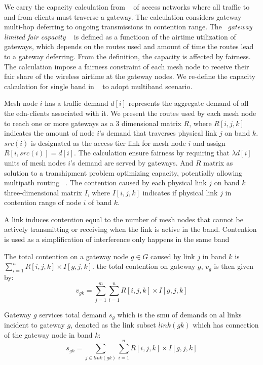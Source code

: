 We carry the capacity calculation from ~\cite{robinson2008adding} of access networks where all traffic to and from clients must traverse a gateway. 
The calculation considers gateway multi-hop deferring to ongoing transmissions in contention range. 
The ~\emph{gateway limited fair capacity} ~\cite{robinson2008adding} is defined as a functioon of the airtime utilization of gateways, which depends on the routes used and amount of time the routes lead to a gateway deferring. From the definition, the capacity is affected by fairness. The calculation impose a fairness constraint of each mesh node to receive their fair share of the wireless airtime at the gateway nodes. 
We re-define the capacity calculation for single band in ~\cite{robinson2008adding} to adopt multiband scenario.

Mesh node $i$ has a traffic demand $d[i]$ represents the aggregate demand of all the edn-clients associated with it. 
We present the routes used by each mesh node to reach one or more gateways as a 3 dimensional matrix $R$, where $R[i,j,k]$ indicates the amount of node $i$'s demand that traverses physical link $j$ on band $k$. 
$src(i)$ is designated as the access tier link for mesh node $i$ and assign $R[i,src(i)]=d[i]$. The calculation ensure fairness by requiring that $\lambda d[i]$ units of mesh nodes $ i$'s demand are served by gateways.
And $R$ matrix as solution to a transhipment problem optimizing capacity, potentially allowing multipath routing ~\cite{robinson2008adding}.
The contention caused by each physical link $j$ on band $k$ three-dimensional matrix $I$, where $I[i,j,k]$ indicates if physical link $j$  in contention range of node $i$ of band $k$.

A link induces contention equal to the number of mesh nodes that cannot be actively transmitting or receiving when the link is active in the band.
Contention is used as a simplification of interference only happens in the same band 

The total contention on a gateway node $g\in G$ caused by link $j$ in band $k$ is $\sum_{i=1}^nR[i,j,k] \times I[g,j,k]$. the total contention on gateway $g$, $v_g$ is then given by:
\begin{equation}
v_{gk}=\sum_{j=1}^m \sum_{i=1}^n R[i,j,k]\times I[g,j,k]
\end{equation}

Gateway $g$ services total demand $s_g$ which is the smu of demands on al links incident to gateway $g$, denoted as the link subset $link(gk)$ which has connection of the gateway node in band $k$:
\begin{equation}
s_{gk}=\sum_{j\in link(gk)} \sum_{i=1}^n R[i,j,k]\times I[g,j,k]
\end{equation}
 
